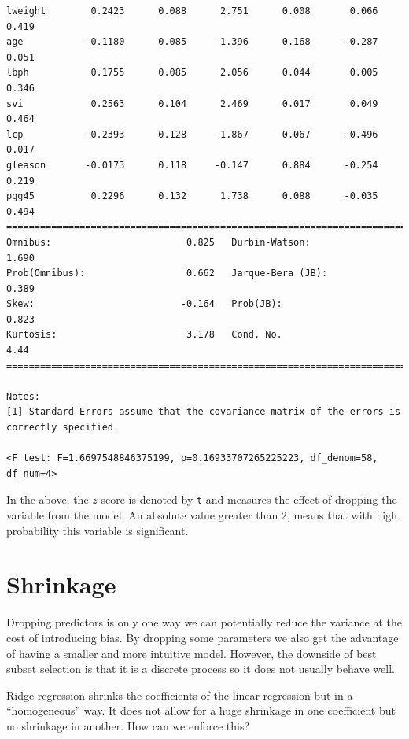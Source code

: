 \documentclass[11pt]{article}
\theoremstyle{definition}
\begin{document}
{\begin{verbatim}
lweight        0.2423      0.088      2.751      0.008       0.066       0.419
age           -0.1180      0.085     -1.396      0.168      -0.287       0.051
lbph           0.1755      0.085      2.056      0.044       0.005       0.346
svi            0.2563      0.104      2.469      0.017       0.049       0.464
lcp           -0.2393      0.128     -1.867      0.067      -0.496       0.017
gleason       -0.0173      0.118     -0.147      0.884      -0.254       0.219
pgg45          0.2296      0.132      1.738      0.088      -0.035       0.494
==============================================================================
Omnibus:                        0.825   Durbin-Watson:                   1.690
Prob(Omnibus):                  0.662   Jarque-Bera (JB):                0.389
Skew:                          -0.164   Prob(JB):                        0.823
Kurtosis:                       3.178   Cond. No.                         4.44
==============================================================================

Notes:
[1] Standard Errors assume that the covariance matrix of the errors is correctly specified.

<F test: F=1.6697548846375199, p=0.16933707265225223, df_denom=58, df_num=4>
\end{verbatim}
	}

In the above, the $z$-score is denoted by \texttt t and measures the effect of
dropping the variable from the model. An absolute value greater than $2$, means
that with high probability this variable is significant.

\section{Shrinkage}
Dropping predictors is only one way we can potentially reduce the variance at
the cost of introducing bias. By dropping some parameters we also get the
advantage of having a smaller and more intuitive model. However, the downside of
best subset selection is that it is a discrete process so it does not usually
behave well.

Ridge regression shrinks the coefficients of the linear regression but in a
``homogeneous'' way. It does not allow for a huge shrinkage in one coefficient
but no shrinkage in another. How can we enforce this?
\end{document}
